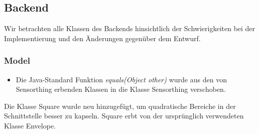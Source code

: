 \subsection{Backend}
Wir betrachten alle Klassen des Backends hinsichtlich der Schwierigkeiten bei der Implementierung und den Änderungen gegenüber dem Entwurf.

\subsubsection{Model}
\noChange
{}
\noChange
{}
\noChange
{}
\noChange
{}
\noChange
{}
\noChange
{}
\noChange
{}
\changedFunctions
\begin{itemize}[noitemsep]
    \item Die Java-Standard Funktion \textit{equals(Object other)} wurde aus den von Sensorthing erbenden Klassen in die Klasse Sensorthing verschoben.
\end{itemize}
\noChange
{}
\noChange
{}
\noChange
{}
\noChange
{}
\noChange
{}
Die Klasse Square wurde neu hinzugefügt, um quadratische Bereiche in der Schnittstelle besser zu kapseln. Square erbt von der ursprünglich verwendeten Klasse Envelope.

